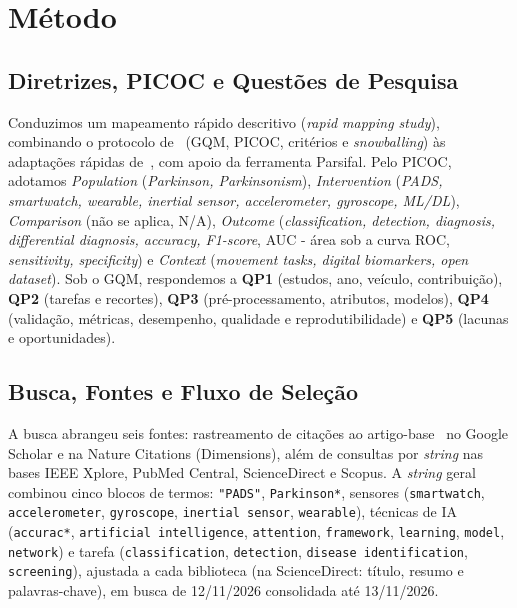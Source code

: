 \section{Método} \label{sec:metodo}

\subsection{Diretrizes, PICOC e Questões de Pesquisa}

Conduzimos um mapeamento rápido descritivo (\textit{rapid mapping study}),
combinando o protocolo de~\cite{fernandes_interoperability_2018}
(GQM, PICOC, critérios e \textit{snowballing}) às adaptações rápidas
de~\cite{garritty_cochrane_2021}, com apoio da ferramenta Parsifal. Pelo PICOC,
adotamos \textit{Population} (\textit{Parkinson, Parkinsonism}),
\textit{Intervention} (\textit{PADS, smartwatch, wearable, inertial sensor,
accelerometer, gyroscope, ML/DL}), \textit{Comparison} (não se aplica, N/A),
\textit{Outcome} (\textit{classification, detection, diagnosis, differential
diagnosis, accuracy, F1-score}, AUC - área sob a curva ROC, \textit{sensitivity,
specificity}) e \textit{Context} (\textit{movement tasks, digital biomarkers, open dataset}). Sob o GQM, respondemos a \textbf{QP1}
(estudos, ano, veículo, contribuição), \textbf{QP2} (tarefas e recortes),
\textbf{QP3} (pré-processamento, atributos, modelos), \textbf{QP4} (validação,
métricas, desempenho, qualidade e reprodutibilidade) e \textbf{QP5} (lacunas e
oportunidades).

\subsection{Busca, Fontes e Fluxo de Seleção}

{\sloppy\setlength{\emergencystretch}{2em}
A busca abrangeu seis fontes: rastreamento de citações ao
artigo-base~\cite{varghese_machine_2024} no Google Scholar e na Nature Citations
(Dimensions), além de consultas por \textit{string} nas bases IEEE Xplore,
PubMed Central, ScienceDirect e Scopus. A \textit{string} geral combinou cinco
blocos de termos: \texttt{"PADS"}, \texttt{Parkinson*}, sensores
(\texttt{smartwatch}, \texttt{accelerometer}, \texttt{gyroscope},
\texttt{inertial sensor}, \texttt{wearable}), técnicas de IA (\texttt{accurac*},
\texttt{artificial intelligence}, \texttt{attention}, \texttt{framework},
\texttt{learning}, \texttt{model}, \texttt{network}) e tarefa
(\texttt{classification}, \texttt{detection}, \texttt{disease identification},
\texttt{screening}), ajustada a cada biblioteca (na ScienceDirect:
título, resumo e palavras-chave), em busca de
12/11/2026 consolidada até 13/11/2026.\par
}

